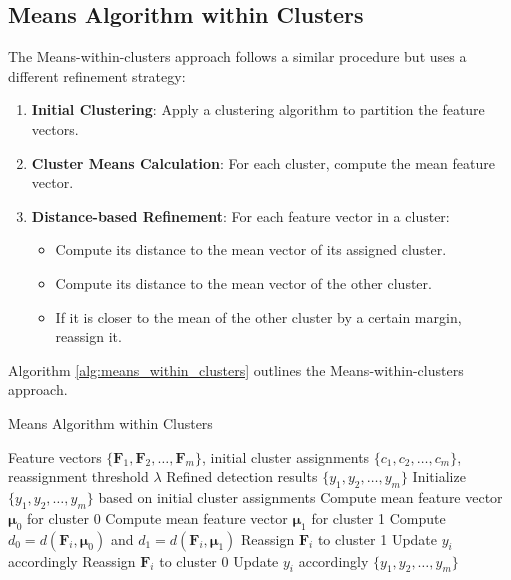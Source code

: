 \documentclass[conference]{IEEEtran}
\begin{document}
\subsection{Means Algorithm within Clusters}

The Means-within-clusters approach follows a similar procedure but uses a different refinement strategy:

\begin{enumerate}
    \item \textbf{Initial Clustering}: Apply a clustering algorithm to partition the feature vectors.
    \item \textbf{Cluster Means Calculation}: For each cluster, compute the mean feature vector.
    \item \textbf{Distance-based Refinement}: For each feature vector in a cluster:
    \begin{itemize}
        \item Compute its distance to the mean vector of its assigned cluster.
        \item Compute its distance to the mean vector of the other cluster.
        \item If it is closer to the mean of the other cluster by a certain margin, reassign it.
    \end{itemize}
\end{enumerate}

Algorithm \ref{alg:means_within_clusters} outlines the Means-within-clusters approach.

\begin{algorithm}
\caption{Means Algorithm within Clusters}
\label{alg:means_within_clusters}
\begin{algorithmic}[1]
\REQUIRE Feature vectors $\{\mathbf{F}_1, \mathbf{F}_2, \ldots, \mathbf{F}_m\}$, initial cluster assignments $\{c_1, c_2, \ldots, c_m\}$, reassignment threshold $\lambda$
\ENSURE Refined detection results $\{y_1, y_2, \ldots, y_m\}$
\STATE Initialize $\{y_1, y_2, \ldots, y_m\}$ based on initial cluster assignments
\STATE Compute mean feature vector $\mathbf{\mu}_0$ for cluster 0
\STATE Compute mean feature vector $\mathbf{\mu}_1$ for cluster 1
    \STATE Compute $d_0 = d(\mathbf{F}_i, \mathbf{\mu}_0)$ and $d_1 = d(\mathbf{F}_i, \mathbf{\mu}_1)$
        \STATE Reassign $\mathbf{F}_i$ to cluster 1
        \STATE Update $y_i$ accordingly
        \STATE Reassign $\mathbf{F}_i$ to cluster 0
        \STATE Update $y_i$ accordingly
    \ENDIF
\ENDFOR
\RETURN $\{y_1, y_2, \ldots, y_m\}$
\end{algorithmic}
\end{algorithm}
\end{document}
